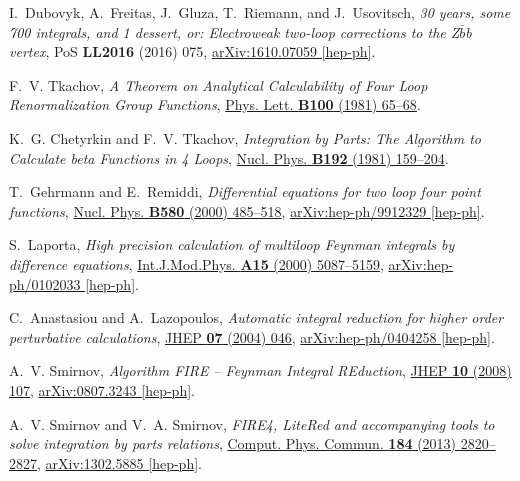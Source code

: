 \documentclass[a4paper,12pt]{scrartcl}
\begin{document}
\begin{thebibliography}{10}
I.~Dubovyk, A.~Freitas, J.~Gluza, T.~Riemann, and J.~Usovitsch, {\em {30 years,
  some 700 integrals, and 1 dessert, or: Electroweak two-loop corrections to
  the Z$\bar b$b vertex}}, PoS {\bfseries LL2016} (2016) 075,
\href{http://arxiv.org/abs/1610.07059}{{\ttfamily arXiv:1610.07059 [hep-ph]}}.

F.~V. Tkachov, {\em {A Theorem on Analytical Calculability of Four Loop
  Renormalization Group Functions}},
\href{http://dx.doi.org/10.1016/0370-2693(81)90288-4}{Phys. Lett. {\bfseries
  B100} (1981) 65--68}.

K.~G. Chetyrkin and F.~V. Tkachov, {\em {Integration by Parts: The Algorithm to
  Calculate beta Functions in 4 Loops}},
\href{http://dx.doi.org/10.1016/0550-3213(81)90199-1}{Nucl. Phys. {\bfseries
  B192} (1981) 159--204}.

T.~Gehrmann and E.~Remiddi, {\em {Differential equations for two loop four
  point functions}},
  \href{http://dx.doi.org/10.1016/S0550-3213(00)00223-6}{Nucl. Phys. {\bfseries
  B580} (2000) 485--518},
\href{http://arxiv.org/abs/hep-ph/9912329}{{\ttfamily arXiv:hep-ph/9912329
  [hep-ph]}}.

S.~Laporta, {\em {High precision calculation of multiloop Feynman integrals by
  difference equations}},
  \href{http://dx.doi.org/10.1016/S0217-751X(00)00215-7}{Int.J.Mod.Phys.
  {\bfseries A15} (2000) 5087--5159},
\href{http://arxiv.org/abs/hep-ph/0102033}{{\ttfamily arXiv:hep-ph/0102033
  [hep-ph]}}.

C.~Anastasiou and A.~Lazopoulos, {\em {Automatic integral reduction for higher
  order perturbative calculations}},
  \href{http://dx.doi.org/10.1088/1126-6708/2004/07/046}{JHEP {\bfseries 07}
  (2004) 046},
\href{http://arxiv.org/abs/hep-ph/0404258}{{\ttfamily arXiv:hep-ph/0404258
  [hep-ph]}}.

A.~V. Smirnov, {\em {Algorithm FIRE -- Feynman Integral REduction}},
  \href{http://dx.doi.org/10.1088/1126-6708/2008/10/107}{JHEP {\bfseries 10}
  (2008) 107},
\href{http://arxiv.org/abs/0807.3243}{{\ttfamily arXiv:0807.3243 [hep-ph]}}.

A.~V. Smirnov and V.~A. Smirnov, {\em {FIRE4, LiteRed and accompanying tools to
  solve integration by parts relations}},
  \href{http://dx.doi.org/10.1016/j.cpc.2013.06.016}{Comput. Phys. Commun.
  {\bfseries 184} (2013) 2820--2827},
\href{http://arxiv.org/abs/1302.5885}{{\ttfamily arXiv:1302.5885 [hep-ph]}}.


\end{thebibliography}
\end{document}
